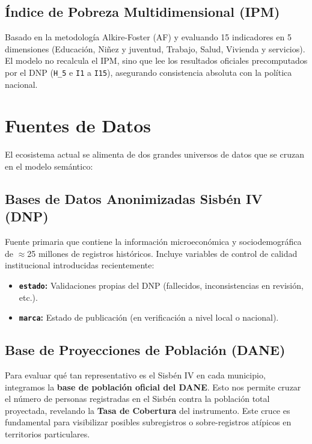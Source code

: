 \documentclass[12pt, a4paper]{article}
\begin{document}
\subsection{Índice de Pobreza Multidimensional (IPM)}
Basado en la metodología Alkire-Foster (AF) y evaluando 15 indicadores en 5 dimensiones (Educación, Niñez y juventud, Trabajo, Salud, Vivienda y servicios). El modelo no recalcula el IPM, sino que lee los resultados oficiales precomputados por el DNP (\texttt{H\_5} e \texttt{I1} a \texttt{I15}), asegurando consistencia absoluta con la política nacional.

\section{Fuentes de Datos}

El ecosistema actual se alimenta de dos grandes universos de datos que se cruzan en el modelo semántico:

\subsection{Bases de Datos Anonimizadas Sisbén IV (DNP)}
Fuente primaria que contiene la información microeconómica y sociodemográfica de \(\approx\)25 millones de registros históricos. Incluye variables de control de calidad institucional introducidas recientemente:
\begin{itemize}
    \item \textbf{\texttt{estado}:} Validaciones propias del DNP (fallecidos, inconsistencias en revisión, etc.).
    \item \textbf{\texttt{marca}:} Estado de publicación (en verificación a nivel local o nacional).
\end{itemize}

\subsection{Base de Proyecciones de Población (DANE)}
Para evaluar qué tan representativo es el Sisbén IV en cada municipio, integramos la \textbf{base de población oficial del DANE}. Esto nos permite cruzar el número de personas registradas en el Sisbén contra la población total proyectada, revelando la \textbf{Tasa de Cobertura} del instrumento. Este cruce es fundamental para visibilizar posibles subregistros o sobre-registros atípicos en territorios particulares.
\end{document}
